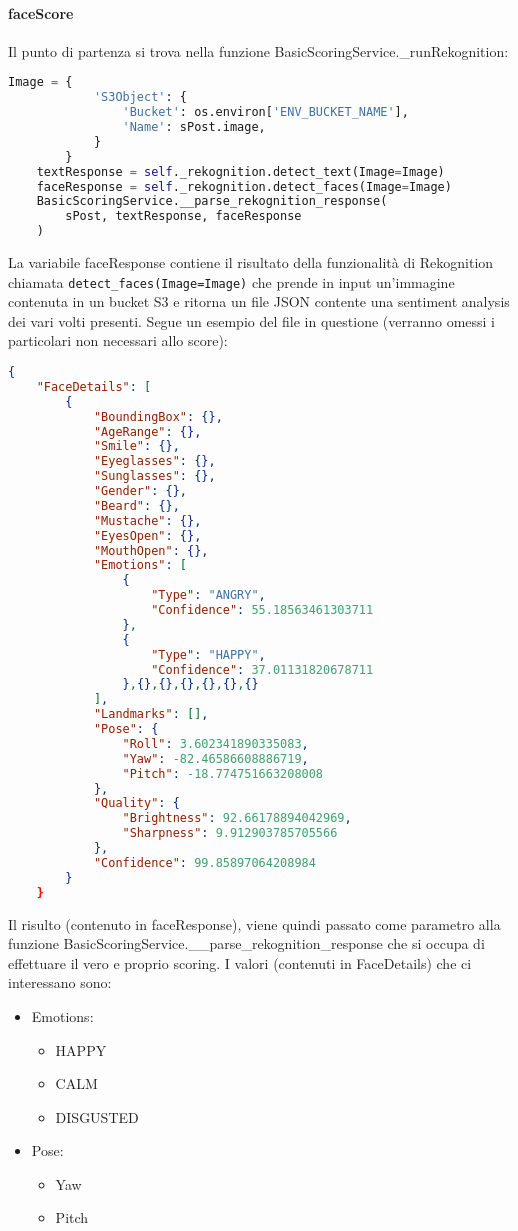 \paragraph{faceScore} \aCapo
Il punto di partenza si trova nella funzione BasicScoringService.\_runRekognition:
\begin{lstlisting}[language=Python]
    Image = {
            'S3Object': {
                'Bucket': os.environ['ENV_BUCKET_NAME'],
                'Name': sPost.image,
            }
        }
    textResponse = self._rekognition.detect_text(Image=Image)
    faceResponse = self._rekognition.detect_faces(Image=Image)
    BasicScoringService.__parse_rekognition_response(
        sPost, textResponse, faceResponse
    )
\end{lstlisting}
La variabile faceResponse contiene il risultato della funzionalità
di Rekognition chiamata \verb+detect_faces(Image=Image)+ che prende in input un'immagine contenuta
in un bucket S3 e ritorna un file JSON contente una sentiment analysis dei vari volti presenti.
Segue un esempio del file in questione (verranno omessi i particolari non necessari allo score):
\begin{lstlisting}[language=JSON]
    {
    "FaceDetails": [
        {
            "BoundingBox": {},
            "AgeRange": {},
            "Smile": {},
            "Eyeglasses": {},
            "Sunglasses": {},
            "Gender": {},
            "Beard": {},
            "Mustache": {},
            "EyesOpen": {},
            "MouthOpen": {},
            "Emotions": [
                {
                    "Type": "ANGRY",
                    "Confidence": 55.18563461303711
                },
                {
                    "Type": "HAPPY",
                    "Confidence": 37.01131820678711
                },{},{},{},{},{},{}
            ],
            "Landmarks": [],
            "Pose": {
                "Roll": 3.602341890335083,
                "Yaw": -82.46586608886719,
                "Pitch": -18.774751663208008
            },
            "Quality": {
                "Brightness": 92.66178894042969,
                "Sharpness": 9.912903785705566
            },
            "Confidence": 99.85897064208984
        }
    }
\end{lstlisting}
Il risulto (contenuto in faceResponse), viene quindi passato come parametro alla funzione 
BasicScoringService.\_\_parse\_rekognition\_response che si occupa di effettuare il vero
e proprio scoring.
I valori (contenuti in FaceDetails) che ci interessano sono:
\begin{itemize}
    \item Emotions: \begin{itemize}
        \item HAPPY
        \item CALM
        \item DISGUSTED \end{itemize}
    \item Pose: \begin{itemize}
        \item Yaw
        \item Pitch \end{itemize}
\end{itemize}
